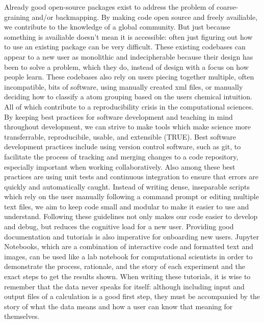 Already good open-source packages exist to address the problem of coarse-graining and/or backmapping\cite{Marrink2007,Ruhle2009,Maerzke2011,MorphCT,Wassenaar2014b}. %
By making code open source and freely availiable, we contribute to the knowledge of a global community. 
But just because something is availiable doesn't mean it is accessible: often just figuring out how to use an existing package can be very difficult\cite{Cummings2019}.
These existing codebases can appear to a new user as monolithic and indecipherable because their design has been to solve a problem, which they do, instead of design with a focus on how people learn.
These codebases also rely on users piecing together multiple, often incompatible, bits of software, using manually created xml files, or manually deciding how to classify a atom grouping based on the users chemical intuition.
All of which contribute to a reproducibility crisis in the computational sciences\cite{Baker2016}.
By keeping best practices for software development and teaching in mind throughout development, we can strive to make tools which make science more transferrable, reproducibile, usable, and extensible (TRUE)\cite{Thompson2020}. %
Best software development practices include using version control software, such as git, to facilitate the process of tracking and merging changes to a code repository, especially important when working collaboratively.
Also among these best practices are using unit tests and continuous integration to ensure that errors are quickly and automatically caught\cite{Wilson2014}.
Instead of writing dense, inseparable scripts which rely on the user manually following a command prompt or editing multiple text files, we aim to keep code small and modular to make it easier to use and understand\cite{Adorf2018a}.
Following these guidelines not only makes our code easier to develop and debug, but reduces the cognitive load for a new user\cite{Jankowski2019}.
Providing good documentation and tutorials is also imperative for onboarding new users.
Jupyter Notebooks, which are a combination of interactive code and formatted text and images, can be used like a lab notebook for computational scientists in order to demonstrate the process, rationale, and the story of each experiment and the exact steps to get the results shown\cite{Rule2019a}.
When writing these tutorials, it is wise to remember that the data never speaks for itself: although including input and output files of a calculation is a good first step, they must be accompanied by the story of what the data means and how a user can know that meaning for themselves\cite{SWC, Wilson2016}.

